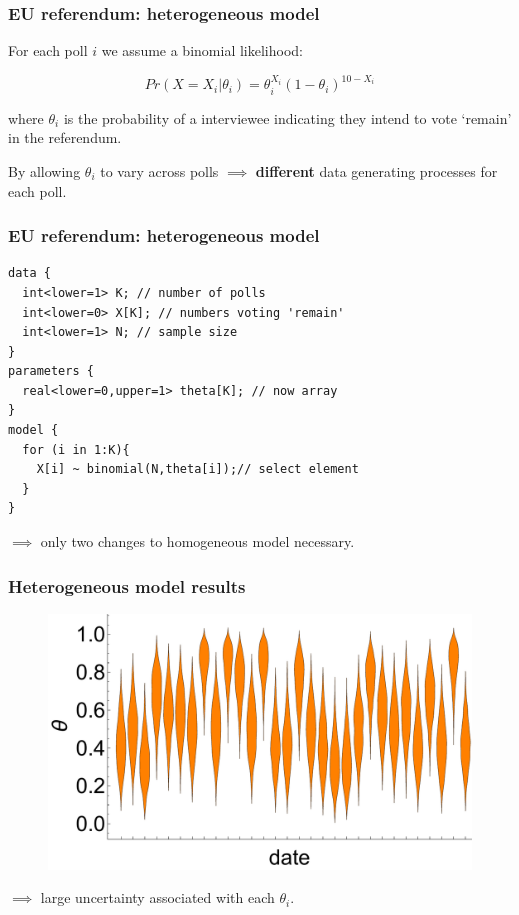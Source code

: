 \documentclass[handout]{beamer}
\begin{document}
\begin{frame}
	\frametitle{EU referendum: heterogeneous model}
	 For each poll $i$ we assume a binomial likelihood:
	
	\begin{equation}
	Pr(X=X_i|\theta_i) = \theta_i^{X_i} (1-\theta_i)^{10-X_i}
	\end{equation}
	
	 where $\theta_i$ is the probability of a interviewee indicating they intend to vote `remain' in the referendum.

    \vspace{0.5cm}
 
	 By allowing $\theta_i$ to vary across polls $\implies$ \textbf{different} data generating processes for each poll.
	
\end{frame}

\begin{frame}[fragile]
	\frametitle{EU referendum: heterogeneous model}
	\begin{verbatim}
data {
  int<lower=1> K; // number of polls
  int<lower=0> X[K]; // numbers voting 'remain'
  int<lower=1> N; // sample size
}
parameters {
  real<lower=0,upper=1> theta[K]; // now array
} 
model {
  for (i in 1:K){ 
    X[i] ~ binomial(N,theta[i]);// select element
  }
}
	\end{verbatim}
	$\implies$ only two changes to homogeneous model necessary.
\end{frame}

\begin{frame}
	\frametitle{Heterogeneous model results}
	\begin{figure}[ht]
		\centerline{\includegraphics[width=1\textwidth]{figures/lec6_euHeteroPosterior.pdf}}
	\end{figure}
	
	 $\implies$ large uncertainty associated with each $\theta_i$.
	
\end{frame}
\end{document}

